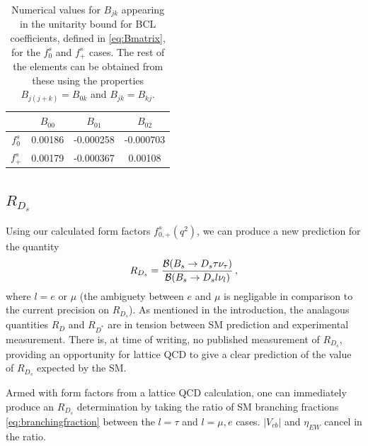 \begin{table}[htb!]
  \begin{center}
    \begin{tabular}{c c c c}
      \hline
      & $B_{00}$ & $B_{01}$ & $B_{02}$ \\ [0.5ex]
      \hline
      $f^s_0$ & 0.00186 & -0.000258 & -0.000703 \\ [0.5ex]
      $f^s_+$ & 0.00179 & -0.000367 & 0.00108 \\ [0.5ex]
      \hline
    \end{tabular}
  \end{center}
  \caption{Numerical values for $B_{jk}$ appearing in the unitarity bound for BCL coefficients, defined in \eqref{eq:Bmatrix}, for the $f^s_0$ and $f^s_+$ cases. The rest of the elements can be obtained from these using the properties $B_{j(j+k)}=B_{0k}$ and $B_{jk}=B_{kj}$. \label{tab:Bmatrix}}
\end{table}


\subsection{$R_{D_s}$}


Using our calculated form factors $f^s_{0,+}(q^2)$, we can produce a new prediction for the quantity
\begin{align}
  R_{D_s} = {\mathcal{B}(B_s\to D_s \tau \nu_{\tau})\over
    \mathcal{B}(B_s\to D_s l \nu_{l})}\,,
\end{align}
where $l=e$ or $\mu$ (the ambiguety between $e$ and $\mu$ is negligable in comparison to the current precision on $R_{D_s}$). As mentioned in the introduction, the analagous quantities $R_{D}$ and $R_{D^*}$ are in tension between SM prediction and experimental measurement. There is, at time of writing, no published measurement of $R_{D_s}$, providing an opportunity for lattice QCD to give a clear prediction of the value of $R_{D_s}$ expected by the SM.

Armed with form factors from a lattice QCD calculation, one can immediately produce an $R_{D_s}$ determination by taking the ratio of SM branching fractions \eqref{eq:branchingfraction} between the $l=\tau$ and $l=\mu,e$ cases. $|V_{cb}|$ and $\eta_{EW}$ cancel in the ratio.

